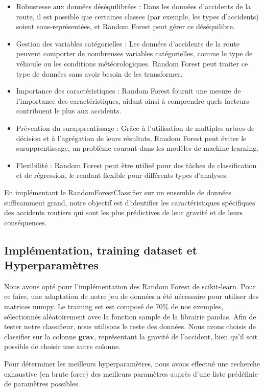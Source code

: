 \documentclass[french]{article}
\begin{document}
\begin{itemize}
    \item Robustesse aux données déséquilibrées : Dans les données d’accidents de la route, il est possible que certaines classes (par exemple, les types d’accidents) soient sous-représentées, et Random Forest peut gérer ce déséquilibre.
    \item Gestion des variables catégorielles : Les données d’accidents de la route peuvent comporter de nombreuses variables catégorielles, comme le type de véhicule ou les conditions météorologiques. Random Forest peut traiter ce type de données sans avoir besoin de les transformer.
    \item Importance des caractéristiques : Random Forest fournit une mesure de l’importance des caractéristiques, aidant ainsi à comprendre quels facteurs contribuent le plus aux accidents.
    \item Prévention du surapprentissage : Grâce à l’utilisation de multiples arbres de décision et à l’agrégation de leurs résultats, Random Forest peut éviter le surapprentissage, un problème courant dans les modèles de machine learning.
    \item Flexibilité : Random Forest peut être utilisé pour des tâches de classification et de régression, le rendant flexible pour différents types d’analyses.
\end{itemize}

En implémentant le RandomForestClassifier sur un ensemble de données suffisamment grand, notre objectif est d'identifier les caractéristiques spécifiques des accidents routiers qui sont les plus prédictives de leur gravité et de leurs conséquences.

\subsection{Implémentation, training dataset et Hyperparamètres}
Nous avons opté pour l’implémentation des Random Forest de scikit-learn. Pour ce faire, une adaptation de notre jeu de données a été nécessaire pour utiliser des matrices numpy. Le training set est composé de 70\% de nos exemples, sélectionnés aléatoirement avec la fonction sample de la librairie pandas. Afin de tester notre classifieur, nous utilisons le reste des données. Nous avons choisis de classifier sur la colonne \textbf{grav}, représentant la gravité de l’accident, bien qu'il soit possible de choisir une autre colonne.

Pour déterminer les meilleurs hyperparamètres, nous avons effectué une recherche exhaustive (en brute force) des meilleurs paramètres auprès d’une liste prédéfinie de paramètres possibles.
\end{document}
